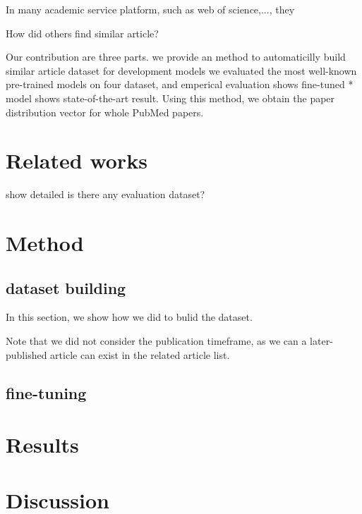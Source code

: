 \documentclass[11pt]{article}
\begin{document}
    In many academic service platform, such as web of science,..., they

    How did others find similar article?

    Our contribution are three parts.
    we provide an method to automaticilly build similar article dataset for development models
    we evaluated the most well-known pre-trained models on four dataset, and emperical evaluation shows fine-tuned * model shows state-of-the-art result.
    Using this method, we obtain the paper distribution vector for whole PubMed papers.


    \section{Related works}

    show detailed is there any evaluation dataset?


    \section{Method}

    \subsection{dataset building}

    In this section, we show how we did to bulid the dataset.

    Note that we did not consider the publication timeframe, as we can a later-published article can exist in the related article list.

    \subsection{fine-tuning}


    \section{Results}


    \section{Discussion}
\end{document}
